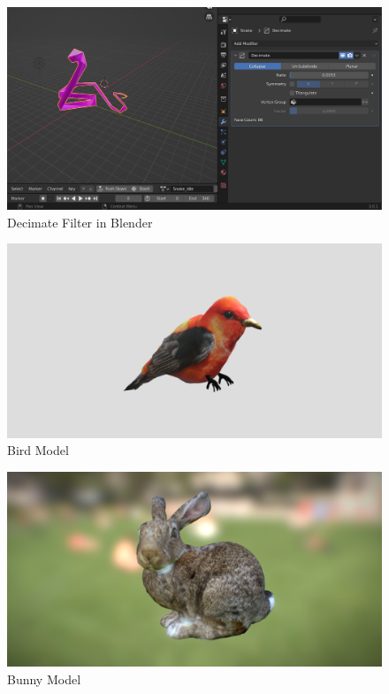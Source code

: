 \documentclass{article}
\begin{document}
    \begin{figure}
        \centering
        \includegraphics[width=\textwidth]{images/decimate.png}
        \caption{Decimate Filter in Blender} \label{fig:decimate}
    \end{figure}
    \begin{figure}
        \centering
        \includegraphics[width=\textwidth]{images/models/bird.png}
        \caption{Bird Model \cite{model-bird}} \label{fig:bird-model}
    \end{figure}
    \begin{figure}
        \centering
        \includegraphics[width=\textwidth]{images/models/bunny.png}
        \caption{Bunny Model \cite{model-bunny}} \label{fig:bunny-model}
    \end{figure}
\end{document}
